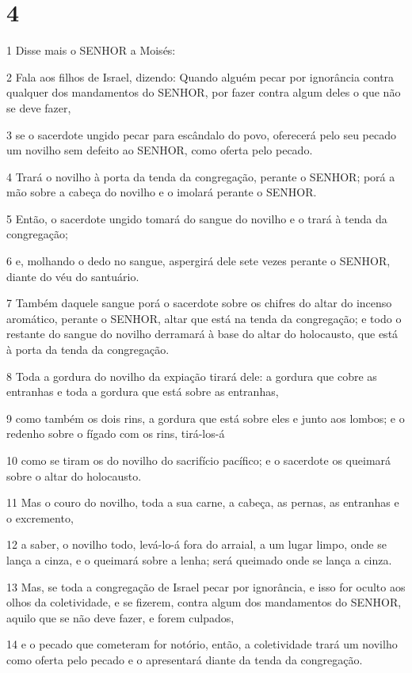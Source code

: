 \chapter{4}

\par 1 Disse mais o SENHOR a Moisés:
\par 2 Fala aos filhos de Israel, dizendo: Quando alguém pecar por ignorância contra qualquer dos mandamentos do SENHOR, por fazer contra algum deles o que não se deve fazer,
\par 3 se o sacerdote ungido pecar para escândalo do povo, oferecerá pelo seu pecado um novilho sem defeito ao SENHOR, como oferta pelo pecado.
\par 4 Trará o novilho à porta da tenda da congregação, perante o SENHOR; porá a mão sobre a cabeça do novilho e o imolará perante o SENHOR.
\par 5 Então, o sacerdote ungido tomará do sangue do novilho e o trará à tenda da congregação;
\par 6 e, molhando o dedo no sangue, aspergirá dele sete vezes perante o SENHOR, diante do véu do santuário.
\par 7 Também daquele sangue porá o sacerdote sobre os chifres do altar do incenso aromático, perante o SENHOR, altar que está na tenda da congregação; e todo o restante do sangue do novilho derramará à base do altar do holocausto, que está à porta da tenda da congregação.
\par 8 Toda a gordura do novilho da expiação tirará dele: a gordura que cobre as entranhas e toda a gordura que está sobre as entranhas,
\par 9 como também os dois rins, a gordura que está sobre eles e junto aos lombos; e o redenho sobre o fígado com os rins, tirá-los-á
\par 10 como se tiram os do novilho do sacrifício pacífico; e o sacerdote os queimará sobre o altar do holocausto.
\par 11 Mas o couro do novilho, toda a sua carne, a cabeça, as pernas, as entranhas e o excremento,
\par 12 a saber, o novilho todo, levá-lo-á fora do arraial, a um lugar limpo, onde se lança a cinza, e o queimará sobre a lenha; será queimado onde se lança a cinza.
\par 13 Mas, se toda a congregação de Israel pecar por ignorância, e isso for oculto aos olhos da coletividade, e se fizerem, contra algum dos mandamentos do SENHOR, aquilo que se não deve fazer, e forem culpados,
\par 14 e o pecado que cometeram for notório, então, a coletividade trará um novilho como oferta pelo pecado e o apresentará diante da tenda da congregação.

